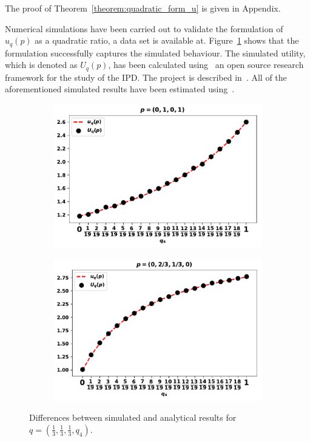 \documentclass[10pt]{article}
\begin{document}
The proof of Theorem~\ref{theorem:quadratic_form_u} is given in Appendix. %

Numerical simulations have been carried out to validate the formulation of
\(u_q(p)\) as a quadratic ratio, a data set is available at.
Figure~\ref{fig:analytical_simulated} shows that the formulation successfully
captures the simulated behaviour. The simulated utility, which is denoted as
\(U_q(p)\), has been calculated using~\cite{axelrodproject} an open source
research framework for the study of the IPD. The project is described
in~\cite{Knight2016}. All of the aforementioned simulated results have been
estimated using~\cite{axelrodproject}.

\begin{figure}[!htbp]
    \begin{center}
        \begin{subfigure}{0.45\textwidth}
            \includegraphics[width=\linewidth]{img/validation_against_player_one.pdf}
        \end{subfigure}
        \begin{subfigure}{0.45\textwidth}
            \includegraphics[width=\linewidth]{img/validation_against_player_two.pdf}
        \end{subfigure}
    \end{center}

    \caption{Differences between simulated and analytical results for
            \(q = (\frac{1}{3}, \frac{1}{3}, \frac{1}{3}, q_4)\).}
    \label{fig:analytical_simulated}
\end{figure}
\end{document}
